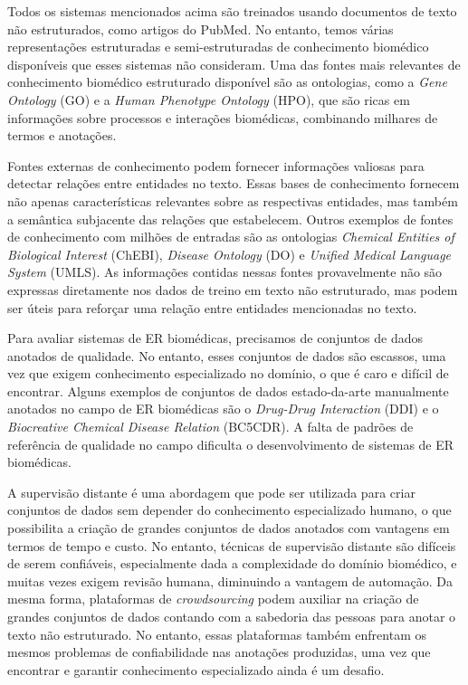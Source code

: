 Todos os sistemas mencionados acima são treinados usando documentos de texto não estruturados, como artigos do PubMed. No entanto, temos várias representações estruturadas e semi-estruturadas de conhecimento biomédico disponíveis que esses sistemas não consideram. Uma das fontes mais relevantes de conhecimento biomédico estruturado disponível são as ontologias, como a \textit{Gene Ontology} (GO) e a \textit{Human Phenotype Ontology} (HPO), que são ricas em informações sobre processos e interações biomédicas, combinando milhares de termos e anotações.

Fontes externas de conhecimento podem fornecer informações valiosas para detectar relações entre entidades no texto. Essas bases de conhecimento fornecem não apenas características relevantes sobre as respectivas entidades, mas também a semântica subjacente das relações que estabelecem. Outros exemplos de fontes de conhecimento com milhões de entradas são as ontologias \textit{Chemical Entities of Biological Interest} (ChEBI), \textit{Disease Ontology} (DO) e \textit{Unified Medical Language System} (UMLS). As informações contidas nessas fontes provavelmente não são expressas diretamente nos dados de treino em texto não estruturado, mas podem ser úteis para reforçar uma relação entre entidades mencionadas no texto.

Para avaliar sistemas de ER biomédicas, precisamos de conjuntos de dados anotados de qualidade. No entanto, esses conjuntos de dados são escassos, uma vez que exigem conhecimento especializado no domínio, o que é caro e difícil de encontrar. Alguns exemplos de conjuntos de dados estado-da-arte manualmente anotados no campo de ER biomédicas são o \textit{Drug-Drug Interaction} (DDI) e o \textit{Biocreative Chemical Disease Relation} (BC5CDR). A falta de padrões de referência de qualidade no campo dificulta o desenvolvimento de sistemas de ER biomédicas.

A supervisão distante é uma abordagem que pode ser utilizada para criar conjuntos de dados sem depender do conhecimento especializado humano, o que possibilita a criação de grandes conjuntos de dados anotados com vantagens em termos de tempo e custo. No entanto, técnicas de supervisão distante são difíceis de serem confiáveis, especialmente dada a complexidade do domínio biomédico, e muitas vezes exigem revisão humana, diminuindo a vantagem de automação. Da mesma forma, plataformas de \textit{crowdsourcing} podem auxiliar na criação de grandes conjuntos de dados contando com a sabedoria das pessoas para anotar o texto não estruturado. No entanto, essas plataformas também enfrentam os mesmos problemas de confiabilidade nas anotações produzidas, uma vez que encontrar e garantir conhecimento especializado ainda é um desafio.

